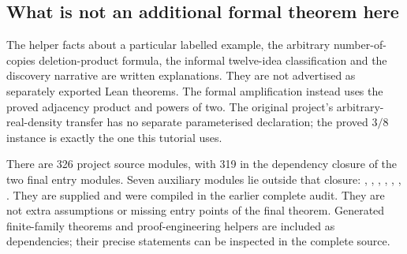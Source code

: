 \subsection{What is not an additional formal theorem here}
The helper facts about a particular labelled example, the arbitrary
number-of-copies deletion-product formula, the informal twelve-idea
classification and the discovery narrative are written explanations.
They are not advertised as separately exported Lean theorems. The
formal amplification instead uses the proved adjacency product and
powers of two. The original project's arbitrary-real-density transfer
has no separate parameterised declaration; the proved \(3/8\) instance
is exactly the one this tutorial uses.

There are 326 project source modules, with 319 in the dependency
closure of the two final entry modules. Seven auxiliary modules lie
outside that closure: , ,
, , ,
, . They are supplied and were
compiled in the earlier complete audit. They are not extra assumptions
or missing entry points of the final theorem. Generated finite-family
theorems and proof-engineering helpers are included as dependencies;
their precise statements can be inspected in the complete source.

